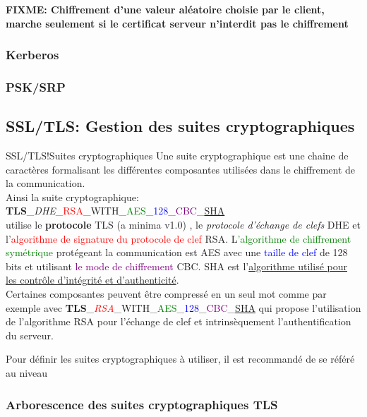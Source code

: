 \documentclass[twoside,a4paper,12pt,titlepage]{book}
\newcommand{\FIXME}[1]{{\huge\textbf{FIXME: #1}}}
\begin{document}
\FIXME{Chiffrement d'une valeur aléatoire choisie par le client, marche seulement si le certificat serveur n'interdit pas le chiffrement}

\subsubsection{Kerberos}
\subsubsection{PSK/SRP}




\subsection{SSL/TLS: Gestion des suites cryptographiques}
\begin{Define}{SSL/TLS!Suites cryptographiques}
Une suite cryptographique est une chaine de caractères formalisant les différentes composantes utilisées dans le chiffrement de la communication.\\
Ainsi la suite cryptographique:\\
\indent\textbf{TLS}\_\textit{DHE}\_\textcolor{red}{RSA}\_WITH\_\textcolor{Green}{AES}\_\textcolor{blue}{128}\_\textcolor{Purple}{CBC}\_\underline{SHA}\\
utilise le \textbf{protocole} \gls{TLS} (a minima v1.0) , le \textit{protocole d'échange de clefs} \gls{DHE} et l'\textcolor{red}{algorithme de signature du protocole de clef} \gls{RSA}. L\textcolor{Green}{'algorithme de chiffrement symétrique} protégeant la communication est AES avec une \textcolor{blue}{taille de clef} de 128 bits et utilisant \textcolor{Purple}{le mode de chiffrement} CBC. SHA est l'\underline{algorithme utilisé pour les contrôle d'intégrité et d'authenticité}.\\
Certaines composantes peuvent être compressé en un seul mot comme par exemple avec \textbf{TLS}\_\textcolor{red}{\textit{RSA}}\_WITH\_\textcolor{Green}{AES}\_\textcolor{blue}{128}\_\textcolor{Purple}{CBC}\_\underline{SHA} qui propose l'utilisation de l'algorithme RSA pour l'échange de clef et intrinsèquement l'authentification du serveur.
\end{Define}
Pour définir les suites cryptographiques à utiliser, il est recommandé de se référé au niveau
\newpage
\subsubsection{Arborescence des suites cryptographiques TLS}
\list{}{\leftmargin -6em}
\item[] 
\endlist
\list{}{\leftmargin 6em}
\item[] 
\endlist
\end{document}
